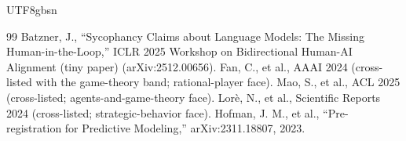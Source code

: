 \documentclass[11pt,letterpaper]{article}
\begin{document}
\begin{CJK}{UTF8}{gbsn}
\begin{thebibliography}{99}
 Batzner, J., ``Sycophancy Claims about Language Models: The Missing Human-in-the-Loop,'' ICLR 2025 Workshop on Bidirectional Human-AI Alignment (tiny paper) (arXiv:2512.00656).
 Fan, C., et al., AAAI 2024 (cross-listed with the game-theory band; rational-player face).
 Mao, S., et al., ACL 2025 (cross-listed; agents-and-game-theory face).
 Lor\`e, N., et al., Scientific Reports 2024 (cross-listed; strategic-behavior face).
 Hofman, J. M., et al., ``Pre-registration for Predictive Modeling,'' arXiv:2311.18807, 2023.
\end{thebibliography}

\end{CJK}
\end{document}
